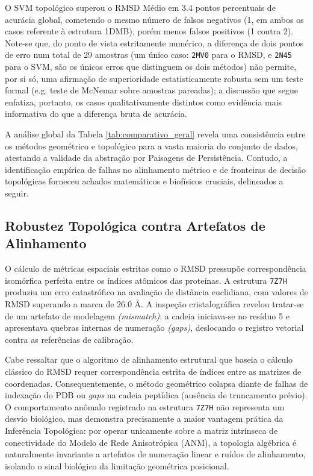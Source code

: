 \documentclass[12pt, a4paper]{article}
\theoremstyle{plain}
\theoremstyle{definition}
\theoremstyle{remark}
\newcommand{\ident}{\hspace{2em}}
\begin{document}
\ident O SVM topológico superou o RMSD Médio em 3.4 pontos percentuais de acurácia global, cometendo o mesmo número de falsos negativos (1, em ambos os casos referente à estrutura 1DMB), porém menos falsos positivos (1 contra 2). Note-se que, do ponto de vista estritamente numérico, a diferença de dois pontos de erro num total de 29 amostras (um único caso: \texttt{2MV0} para o RMSD, e \texttt{2N45} para o SVM, são os únicos erros que distinguem os dois métodos) não permite, por si só, uma afirmação de superioridade estatisticamente robusta sem um teste formal (e.g. teste de McNemar sobre amostras pareadas); a discussão que segue enfatiza, portanto, os casos qualitativamente distintos como evidência mais informativa do que a diferença bruta de acurácia.

\ident A análise global da Tabela \ref{tab:comparativo_geral} revela uma consistência entre os métodos geométrico e topológico para a vasta maioria do conjunto de dados, atestando a validade da abstração por Paisagens de Persistência. Contudo, a identificação empírica de falhas no alinhamento métrico e de fronteiras de decisão topológicas forneceu achados matemáticos e biofísicos cruciais, delineados a seguir.

\subsection{Robustez Topológica contra Artefatos de Alinhamento}

\ident O cálculo de métricas espaciais estritas como o RMSD pressupõe correspondência isomórfica perfeita entre os índices atômicos das proteínas. A estrutura \texttt{7Z7H} produziu um erro catastrófico na avaliação de distância euclidiana, com valores de RMSD superando a marca de $26.0$ Å. A inspeção cristalográfica revelou tratar-se de um artefato de modelagem \textit{(mismatch)}: a cadeia iniciava-se no resíduo 5 e apresentava quebras internas de numeração \textit{(gaps)}, deslocando o registro vetorial contra as referências de calibração. 

\ident Cabe ressaltar que o algoritmo de alinhamento estrutural que baseia o cálculo clássico do RMSD requer correspondência estrita de índices entre as matrizes de coordenadas. Consequentemente, o método geométrico colapsa diante de falhas de indexação do PDB ou \emph{gaps} na cadeia peptídica (ausência de truncamento prévio). O comportamento anômalo registrado na estrutura \texttt{7Z7H} não representa um desvio biológico, mas demonstra precisamente a maior vantagem prática da Inferência Topológica: por operar unicamente sobre a matriz intrínseca de conectividade do Modelo de Rede Anisotrópica (ANM), a topologia algébrica é naturalmente invariante a artefatos de numeração linear e ruídos de alinhamento, isolando o sinal biológico da limitação geométrica posicional.
\end{document}
